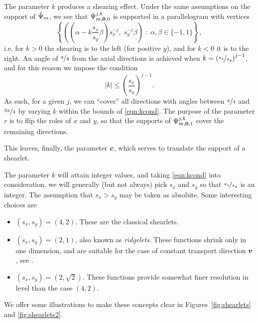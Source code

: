 The parameter $k$ produces a shearing effect. Under the same assumptions on the support of $\hat{\Psi}_m$, we see
that $\Psi_{m,{\bm0},0}^{j,k}$ is supported in a parallelogram with vertices
\[
    \left\{ \left(\left(\alpha-k\frac{s_x}{s_y}\beta\right)s_x^{-j}, \;s_y^{-j}\beta \right)
            \;:\; \alpha,\beta \in \{-1,1\} \right\},
\]
i.e. for $k>0$ the shearing is to the left (for positive $y$), and for $k<0$ it is to the right. An angle of
$\nicefrac{\pi}{4}$ from the axial directions is achieved when $k=\left(\nicefrac{s_x}{s_y}\right)^{j-1}$, and
for this reason we impose the condition
\begin{equation} \label{eqn:kcond}
    |k| \leq \left(\frac{s_x}{s_y}\right)^{j-1}.
\end{equation}
As such, for a given $j$, we can ``cover'' all directions with angles between $\nicefrac{\pi}{4}$ and
$\nicefrac{3\pi}{4}$ by varying $k$ within the bounds of \eqref{eqn:kcond}. The purpose of the parameter $r$
is to flip the roles of $x$ and $y$, so that the supports of $\Psi_{m,{\bm0},1}^{j,k}$ cover the remaining
directions.

This leaves, finally, the parameter ${\bm c}$, which serves to translate the support of a shearlet.

The parameter $k$ will attain integer values, and taking \eqref{eqn:kcond} into consideration, we will
generally (but not always) pick $s_x$ and $s_y$ so that $\nicefrac{s_x}{s_y}$ is an integer. The assumption
that $s_x>s_y$ may be taken as absolute. Some interesting choices are

\begin{itemize}
\item $(s_x,s_y) = (4,2)$. These are the classical shearlets.
\item $(s_x,s_y) = (2,1)$, also known as {\em ridgelets}. These functions shrink only in one dimension, and
are suitable for the case of constant transport direction ${\bm v}$, see \cite{Grohs2012rfd}.
\item $(s_x,s_y) = (2,\sqrt{2})$. These functions provide somewhat finer resolution in level than the case
$(4,2)$.
\end{itemize}

We offer some illustrations to make these concepts clear in Figures~\ref{fig:shearlets} and
\ref{fig:shearlets2}.

